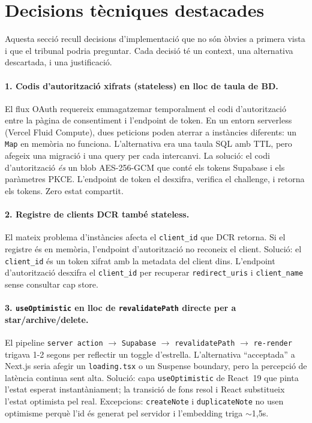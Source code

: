 \section{Decisions tècniques destacades}
\label{sec:decisions-tecniques}

Aquesta secció recull decisions d'implementació que no són òbvies a primera vista i que el tribunal podria preguntar. Cada decisió té un context, una alternativa descartada, i una justificació.

\paragraph{1. Codis d'autorització xifrats (stateless) en lloc de taula de BD.}
El flux OAuth requereix emmagatzemar temporalment el codi d'autorització entre la pàgina de consentiment i l'endpoint de token. En un entorn serverless (Vercel Fluid Compute), dues peticions poden aterrar a instàncies diferents: un \texttt{Map} en memòria no funciona. L'alternativa era una taula SQL amb TTL, pero afegeix una migració i una query per cada intercanvi. La solució: el codi d'autorització \emph{és} un blob AES-256-GCM que conté els tokens Supabase i els paràmetres PKCE. L'endpoint de token el desxifra, verifica el challenge, i retorna els tokens. Zero estat compartit.

\paragraph{2. Registre de clients DCR també stateless.}
El mateix problema d'instàncies afecta el \texttt{client\_id} que DCR retorna. Si el registre és en memòria, l'endpoint d'autorització no reconeix el client. Solució: el \texttt{client\_id} és un token xifrat amb la metadata del client dins. L'endpoint d'autorització desxifra el \texttt{client\_id} per recuperar \texttt{redirect\_uris} i \texttt{client\_name} sense consultar cap store.

\paragraph{3. \texttt{useOptimistic} en lloc de \texttt{revalidatePath} directe per a star/archive/delete.}
El pipeline \texttt{server action} $\rightarrow$ \texttt{Supabase} $\rightarrow$ \texttt{revalidatePath} $\rightarrow$ \texttt{re-render} trigava 1-2 segons per reflectir un toggle d'estrella. L'alternativa ``acceptada'' a Next.js seria afegir un \texttt{loading.tsx} o un Suspense boundary, pero la percepció de latència continua sent alta. Solució: capa \texttt{useOptimistic} de React~19 que pinta l'estat esperat instantàniament; la transició de fons resol i React substitueix l'estat optimista pel real. Excepcions: \texttt{createNote} i \texttt{duplicateNote} no usen optimisme perquè l'id és generat pel servidor i l'embedding triga $\sim$1{,}5s.

